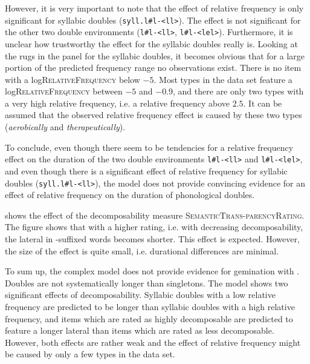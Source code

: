 However, it is very important to note that the effect of relative frequency is only significant for syllabic doubles (\texttt{syll.l\#l-<ll>}).  The effect is not significant for the other two double environments (\texttt{l\#l-<ll>}, \texttt{l\#l-<lel>}). 
Furthermore, it is unclear how trustworthy the effect for the syllabic doubles really is. Looking at the rugs in the panel for the syllabic doubles, it becomes obvious that for a large portion of the predicted frequency range no observations exist. There is no item with a log\textsc{RelativeFrequency} below $-5$. 
Most types in the data set feature a log\textsc{RelativeFrequency} between $-5$ and $-0.9$, and there are only two types with a very high relative frequency, i.e. a relative frequency  above $2.5$. It can be assumed that the observed relative frequency effect is caused by these two types (\textit{aerobically} and \textit{therapeutically}). 


To conclude, even though there seem to be tendencies for a relative frequency effect on the duration of the two double environments  \texttt{l\#l-<ll>} and \texttt{l\#l-<lel>}, and even though there is a significant effect of relative frequency for syllabic doubles  (\texttt{syll.l\#l-<ll>}), the model does not provide convincing evidence for an effect of relative frequency on the duration of phonological doubles.







 shows the effect of the decomposability measure \textsc{SemanticTrans-parencyRating}. The figure shows that with a higher rating, i.e. with decreasing decomposability, the lateral in -suffixed words becomes shorter. This effect is expected. However, the size of the effect is quite small, i.e. durational differences are minimal.





To sum up, the complex model does not provide evidence for gemination with . Doubles are not systematically longer than singletons. 
The model shows two significant effects of decomposability. Syllabic doubles with a low relative frequency are predicted to be longer than syllabic doubles with a high relative frequency, and items which are rated as highly decomposable are predicted to feature a longer lateral than items which are rated as less decomposable. However, both effects are rather weak and the effect of relative frequency might be caused by only a few types in the data set.



